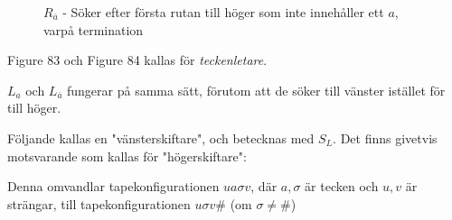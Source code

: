 \begin{figure}[ht!]
    \centering
    \caption{$R_{\overline{a}}$ - Söker efter första rutan till höger som inte innehåller ett $a$, varpå termination}
\end{figure}\par
\noindent Figure 83 och Figure 84 kallas för \textit{teckenletare}.\par
\noindent $L_a$ och $L_{\overline{a}}$ fungerar på samma sätt, förutom att de söker till vänster istället för till höger.
\par\bigskip
\noindent Följande kallas en "vänsterskiftare", och betecknas med $S_L$. Det finns givetvis motsvarande som kallas för "högerskiftare":
\begin{figure}[ht!]
    \centering
    \caption{}
\end{figure}
\par\bigskip
\noindent Denna omvandlar tapekonfigurationen $ua\sigma v$, där $a,\sigma$ är tecken och $u,v$ är strängar, till tapekonfigurationen $u\sigma v\#$ (om $\sigma\neq\#$)
